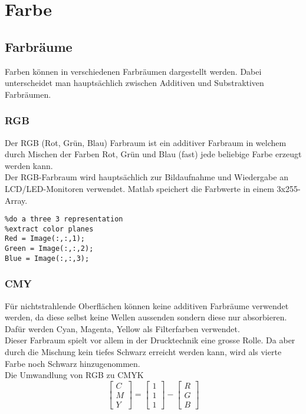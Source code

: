 \section{Farbe}
\subsection{Farbräume}
Farben können in verschiedenen Farbräumen dargestellt werden. Dabei unterscheidet man hauptsächlich zwischen Additiven und Substraktiven Farbräumen.
\subsubsection{RGB}
Der RGB (Rot, Grün, Blau) Farbraum ist ein additiver Farbraum in welchem durch Mischen der Farben Rot, Grün und Blau (fast) jede beliebige Farbe erzeugt werden kann.\\
Der RGB-Farbraum wird hauptsächlich zur Bildaufnahme und Wiedergabe an LCD/LED-Monitoren verwendet. Matlab speichert die Farbwerte in einem 3x255-Array.
\begin{lstlisting}
%do a three 3 representation
%extract color planes
Red = Image(:,:,1);
Green = Image(:,:,2);
Blue = Image(:,:,3);
\end{lstlisting}

\subsubsection{CMY}
Für nichtstrahlende Oberflächen können keine additiven Farbräume verwendet werden, da diese selbst keine Wellen aussenden sondern diese nur absorbieren. Dafür werden Cyan, Magenta, Yellow als Filterfarben verwendet.\\
Dieser Farbraum spielt vor allem in der Drucktechnik eine grosse Rolle. Da aber durch die Mischung kein tiefes Schwarz erreicht werden kann, wird als vierte Farbe noch Schwarz hinzugenommen.\\
Die Umwandlung von RGB zu CMYK
\begin{equation}
\begin{bmatrix}
C\\
M\\
Y
\end{bmatrix} =
\begin{bmatrix}
1\\
1\\
1
\end{bmatrix} - 
\begin{bmatrix}
R\\
G\\
B
\end{bmatrix}
\end{equation}

